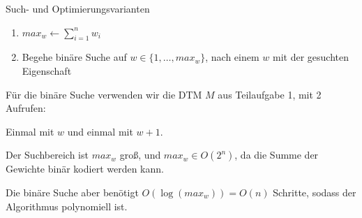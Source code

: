 \documentclass[answers]{submit}
\begin{document}
\begin{exercise}[12]{Such- und Optimierungsvarianten}
{\begin{enumerate}
            \begin{enumerate}
              \item $max_w \gets \sum_{i=1}^n w_i$
              \item Begehe binäre Suche auf $w\in\{1,\dots,max_w\}$, nach einem $w$ mit der gesuchten Eigenschaft
            \end{enumerate}

            Für die binäre Suche verwenden wir die DTM $M$ aus Teilaufgabe 1, mit 2 Aufrufen:

            Einmal mit $w$ und einmal mit $w+1$.

            Der Suchbereich ist $max_w$ groß, und $max_w\in O(2^n)$, da die Summe der Gewichte binär kodiert werden kann.

            Die binäre Suche aber benötigt $O(\log(max_w))=O(n)$ Schritte, sodass der Algorithmus polynomiell ist.
    \end{enumerate}
  }
\end{exercise}
\end{document}
